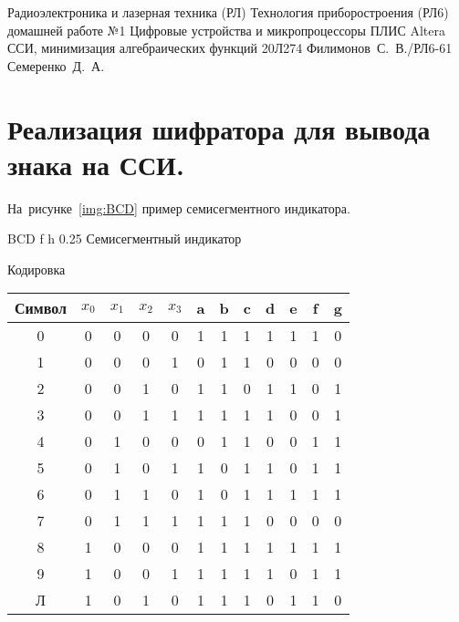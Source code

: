 \documentclass{bmstu}
\begin{document}
	\makereporttitle
	{Радиоэлектроника и лазерная техника (РЛ)} %
	{Технология приборостроения (РЛ6)} %
	{домашней работе №1} %
	{Цифровые устройства и микропроцессоры} %
	{ПЛИС Altera ССИ, минимизация алгебраических функций} %
	{20Л274} %
	{Филимонов~С.~В./РЛ6-61} %
	{Семеренко~Д.~А.} %
	
	\tableofcontents

	\chapter{Реализация шифратора для вывода знака на ССИ.}
	На~рисунке~\ref{img:BCD} пример семисегментного индикатора.
	
	{BCD} %
	{f} %
	{h} %
	{0.25\textwidth} %
	{Семисегментный индикатор} %
	
	Кодировка

	\begin{center}
		\begin{tabular}{ |c||c|c|c|c||c|c|c|c|c|c|c| } 
			\hline
		     Символ & $x_0$ & $x_1$ & $x_2$ & $x_3$ &  a & b & c & d & e & f & g \\
		    \hline
			 0 & 0 & 0 & 0 & 0 & 1 & 1 & 1 & 1 & 1 & 1 & 0 \\ 
			 1 & 0 & 0 & 0 & 1 & 0 & 1 & 1 & 0 & 0 & 0 & 0 \\
			 2 & 0 & 0 & 1 & 0 & 1 & 1 & 0 & 1 & 1 & 0 & 1 \\
			 3 & 0 & 0 & 1 & 1 & 1 & 1 & 1 & 1 & 0 & 0 & 1 \\
			 4 & 0 & 1 & 0 & 0 & 0 & 1 & 1 & 0 & 0 & 1 & 1 \\
			 5 & 0 & 1 & 0 & 1 & 1 & 0 & 1 & 1 & 0 & 1 & 1 \\
			 6 & 0 & 1 & 1 & 0 & 1 & 0 & 1 & 1 & 1 & 1 & 1 \\
			 7 & 0 & 1 & 1 & 1 & 1 & 1 & 1 & 0 & 0 & 0 & 0 \\
			 8 & 1 & 0 & 0 & 0 & 1 & 1 & 1 & 1 & 1 & 1 & 1 \\
			 9 & 1 & 0 & 0 & 1 & 1 & 1 & 1 & 1 & 0 & 1 & 1 \\
			 Л & 1 & 0 & 1 & 0 & 1 & 1 & 1 & 0 & 1 & 1 & 0 \\
			\hline
		\end{tabular}
	\end{center}
	
\end{document}
